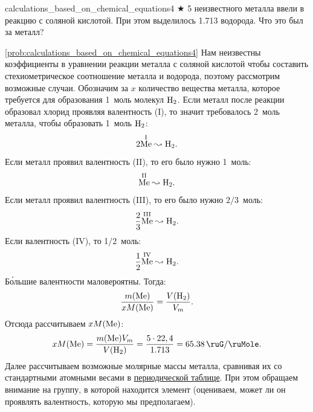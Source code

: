 \begin{problem}{}{calculations_based_on_chemical_equations4}
    $\bigstar$ \qty{5}{\ruG} неизвестного металла ввели в реакцию с соляной кислотой. При этом выделилось \qty{1,713}{\ruL} водорода. Что это был за металл?
    \begin{sol}{\ref{prob:calculations_based_on_chemical_equations4}}
        Нам неизвестны коэффициенты в уравнении реакции металла с соляной кислотой чтобы составить стехиометрическое соотношение металла и водорода, поэтому рассмотрим возможные случаи. Обозначим за $x$ количество вещества металла, которое требуется для образования 1~моль молекул $\ce{H2}$. Если металл после реакции образовал хлорид проявляя валентность (I), то значит требовалось 2~моль металла, чтобы образовать 1~моль $\ce{H2}$:
        \begin{equation*}
            2\overset{\text{I}}{\ce{Me}} \leadsto \ce{H2}.
        \end{equation*}
        Если металл проявил валентность (II), то его было нужно 1~моль:
        \begin{equation*}
            \overset{\text{II}}{\ce{Me}} \leadsto \ce{H2}.
        \end{equation*}
        Если металл проявил валентность (III), то его было нужно $2/3$~моль:
        \begin{equation*}
            \frac{2}{3}\overset{\text{III}}{\ce{Me}} \leadsto \ce{H2}.
        \end{equation*}
        Если валентность (IV), то 1/2~моль:
        \begin{equation*}
            \frac{1}{2}\overset{\text{IV}}{\ce{Me}} \leadsto \ce{H2}.
        \end{equation*}
        Б\'{о}льшие валентности маловероятны. Тогда:
        \begin{equation*}
            \frac{m(\ce{Me})}{xM(\ce{Me})} = \frac{V(\ce{H2})}{V_m}.
        \end{equation*}
        Отсюда рассчитываем $xM(\ce{Me})$:
        \begin{equation*}
            xM(\ce{Me}) = \frac{m(\ce{Me})V_m}{V(\ce{H2})} = \frac{5 \cdot 22,4}{\num{1,713}} = \qty{65,38}{\ruG\per\ruMole}.
        \end{equation*}
        Далее рассчитываем возможные молярные массы металла, сравнивая их со стандартными атомными весами в \hyperref[appendix:periodic_table]{периодической таблице}. При этом обращаем внимание на группу, в которой находится элемент (оцениваем, может ли он проявлять валентность, которую мы предполагаем).\\

\end{sol}
\end{problem}
